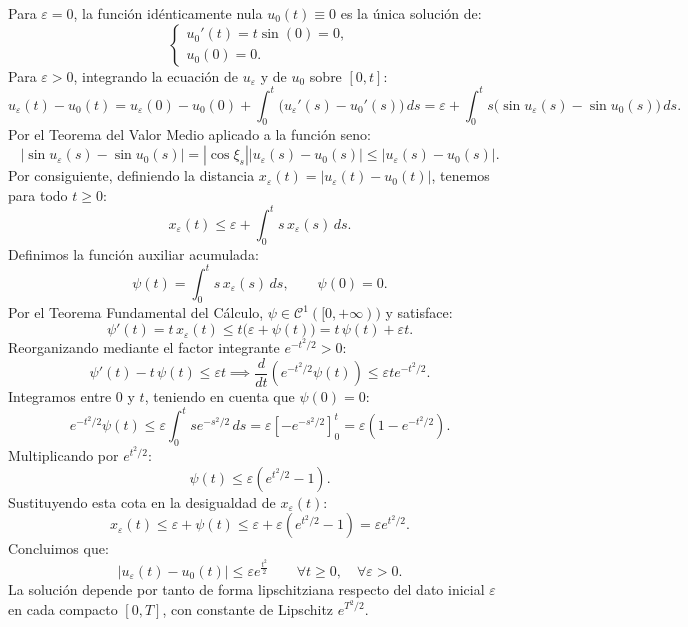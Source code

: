{    Para $\varepsilon = 0$, la función idénticamente nula $u_0(t) \equiv 0$ es la única solución de:
    \[
        \begin{cases}
            u_0'(t) = t \sin(0) = 0, \\
            u_0(0) = 0.
        \end{cases}
    \]
    Para $\varepsilon > 0$, integrando la ecuación de $u_\varepsilon$ y de $u_0$ sobre $[0, t]$:
    \[
        u_\varepsilon(t) - u_0(t) = u_\varepsilon(0) - u_0(0) + \int_0^t \bigl( u_\varepsilon'(s) - u_0'(s) \bigr) \, ds = \varepsilon + \int_0^t s \bigl( \sin u_\varepsilon(s) - \sin u_0(s) \bigr) \, ds.
    \]
    Por el Teorema del Valor Medio aplicado a la función seno:
    \[
        |\sin u_\varepsilon(s) - \sin u_0(s)| = |\cos \xi_s| |u_\varepsilon(s) - u_0(s)| \le |u_\varepsilon(s) - u_0(s)|.
    \]
    Por consiguiente, definiendo la distancia $x_\varepsilon(t) = |u_\varepsilon(t) - u_0(t)|$, tenemos para todo $t \ge 0$:
    \[
        x_\varepsilon(t) \le \varepsilon + \int_0^t s \, x_\varepsilon(s) \, ds.
    \]
    Definimos la función auxiliar acumulada:
    \[
        \psi(t) = \int_0^t s \, x_\varepsilon(s) \, ds, \qquad \psi(0) = 0.
    \]
    Por el Teorema Fundamental del Cálculo, $\psi \in \mathcal{C}^1([0, +\infty))$ y satisface:
    \[
        \psi'(t) = t \, x_\varepsilon(t) \le t \bigl( \varepsilon + \psi(t) \bigr) = t \, \psi(t) + \varepsilon t.
    \]
    Reorganizando mediante el factor integrante $e^{-t^2/2} > 0$:
    \[
        \psi'(t) - t \, \psi(t) \le \varepsilon t \implies \frac{d}{dt} \left( e^{-t^2/2} \psi(t) \right) \le \varepsilon t e^{-t^2/2}.
    \]
    Integramos entre $0$ y $t$, teniendo en cuenta que $\psi(0) = 0$:
    \[
        e^{-t^2/2} \psi(t) \le \varepsilon \int_0^t s e^{-s^2/2} \, ds = \varepsilon \left[ -e^{-s^2/2} \right]_0^t = \varepsilon \left( 1 - e^{-t^2/2} \right).
    \]
    Multiplicando por $e^{t^2/2}$:
    \[
        \psi(t) \le \varepsilon \left( e^{t^2/2} - 1 \right).
    \]
    Sustituyendo esta cota en la desigualdad de $x_\varepsilon(t)$:
    \[
        x_\varepsilon(t) \le \varepsilon + \psi(t) \le \varepsilon + \varepsilon \left( e^{t^2/2} - 1 \right) = \varepsilon e^{t^2/2}.
    \]
    Concluimos que:
    \[
        |u_\varepsilon(t) - u_0(t)| \le \varepsilon e^{\frac{t^2}{2}} \qquad \forall t \ge 0, \quad \forall \varepsilon > 0.
    \]
    La solución depende por tanto de forma lipschitziana respecto del dato inicial $\varepsilon$ en cada compacto $[0, T]$, con constante de Lipschitz $e^{T^2/2}$.
}
